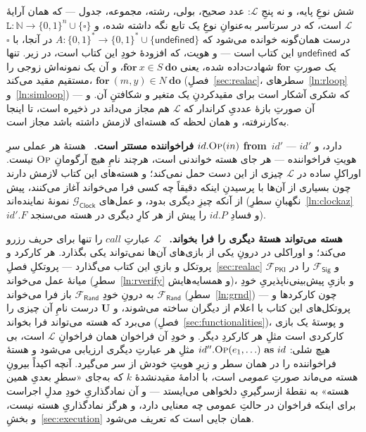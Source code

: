 \documentclass[10pt,oneside,openany]{book}
\newcommand{\uses}{\mathbf{U}}
\newcommand{\op}[1]{\textnormal{\textsc{#1}}}
\newcommand{\id}{id}
\newcommand{\Frand}{\mathcal{F}_{\mathsf{Rand}}}
\newcommand{\Fsig}{\mathcal{F}_{\mathsf{Sig}}}
\newcommand{\Gclock}{\mathcal{G}_{\mathsf{Clock}}}
\newcommand{\Fpki}{\mathcal{F}_{\mathsf{PKI}}}
\newcommand{\unset}{\square}
\newcommand{\V}[1]{\mathtt{#1}}
\newcommand{\Op}{\op{Op}}
\newcommand{\heading}[1]{\medskip\par\noindent\textcolor{accent}{\textbf{#1.}}\ }
\theoremstyle{accentdef}
\theoremstyle{accentplain}
\begin{document}
شش نوعِ پایه، و نه پنجِ $\mathcal{L}$: عدد صحیح، بولی، رشته، مجموعه، جدول
--- که همان آرایهٔ $\mathcal{L}$ است، که در سرتاسر به‌عنوانِ نوعِ یک تابع نگه
داشته شده، و $\V{L} : \mathbb{N} \to \{0,1\}^{n} \cup \{\unset\}$ درست
همان‌گونه خوانده می‌شود که $A : \{0,1\}^{*} \to \{0,1\}^{*} \cup
\{\textsf{undefined}\}$ در آنجا، با $\unset$ که $\textsf{undefined}$ِ این
کتاب است --- و هویت، که افزودهٔ خودِ این کتاب است، در زیر. تنها یک صورتِ
$\textbf{for}$ شهادت‌داده شده، یعنی $\textbf{for}\ x \in S\ \textbf{do}$، و
آن یک نمونه‌اش زوجی را مستقیم مقید می‌کند، $\textbf{for}\ (m,y) \in N\
\textbf{do}$ (فصلِ~\ref{sec:realac}، سطرهای~\ref{ln:rloop}
و~\ref{ln:simloop}) --- که شکری آشکار است برای مقیدکردنِ یک متغیر و شکافتنِ
آن. و آن صورتِ بازهٔ عددیِ کراندار که $\mathcal{L}$ هم مجاز می‌داند در ذخیره
است، تا اینجا به‌کارنرفته، و همان لحظه که هسته‌ای لازمش داشته باشد مجاز
است.

\heading{فراخواننده مستتر است} هستهٔ هر عملی سرِ $\id.\Op(in)$
\textbf{from}~$\id'$ دارد، و $\id'$ --- هویتِ فراخواننده --- هر جای هسته
خواندنی است، هرچند نامِ هیچ آرگومانِ $\Op$ نیست. اوراکلِ ساده در
$\mathcal{L}$ چیزی از این دست حمل نمی‌کند؛ و هسته‌های این کتاب لازمش دارند
چون بسیاری از آن‌ها با پرسیدنِ اینکه دقیقاً چه کسی فرا می‌خواند آغاز
می‌کنند، پیش از آنکه چیزِ دیگری بدود، و عمل‌های $\Gclock$ نمونهٔ نماینده‌اند
(نگهبانِ سطرِ~\ref{ln:clockaz} $\id'.F$ و فسادِ $\id.P$ را پیش از هر کارِ
دیگری در هسته می‌سنجد).

\heading{هسته می‌تواند هستهٔ دیگری را فرا بخواند} $\mathcal{L}$ عبارتِ
$\mathit{call}$ را تنها برای حریف رزرو می‌کند؛ و اوراکلی در درونِ یکی از
بازی‌های آن‌ها نمی‌تواند یکی بگذارد. هر کارکرد و پروتکل و بازیِ این کتاب
می‌گذارد --- پروتکلِ فصلِ~\ref{sec:realac} $\Fpki$ و $\Fsig$ را در میانهٔ
عمل می‌خواند (سطرِ~\ref{ln:rverify} و همسایه‌هایش)، و بازیِ
پیش‌بینی‌ناپذیریِ خودِ $\Frand$ به درونِ خودِ $\Frand$ باز فرا می‌خواند
(سطرِ~\ref{ln:grnd}) --- چون کارکردها و پروتکل‌های این کتاب با اعلام از
دیگران ساخته می‌شوند، و $\uses$ درست نامِ آن چیزی را می‌برد که هسته
می‌تواند فرا بخواند (فصلِ~\ref{sec:functionalities})، و پوستهٔ یک بازی
کارکردی است مثلِ هر کارکردِ دیگر. و خودِ آن فراخوان همان فراخوانِ
$\mathcal{L}$ است، بی هیچ شلی: $\id''.\Op(e_1,\ldots)\ \textbf{as}\ \id$
مثلِ هر عبارتِ دیگری ارزیابی می‌شود و هستهٔ فراخواننده را در همان سطر و
زیرِ هویتِ خودش از سر می‌گیرد. آنچه اکیداً بیرونِ هسته می‌ماند صورتِ
\emph{عمومی} است، با ادامهٔ مقیدنشدهٔ $k$ که به‌جای «سطرِ بعدیِ همین هسته» به
نقطهٔ از‌سرگیریِ دلخواهی می‌ایستد --- و آن نمادگذاریِ خودِ مدلِ اجراست برای
اینکه فراخوان در حالتِ عمومی چه معنایی دارد، و هرگز نمادگذاریِ هسته نیست، و
بخشِ~\ref{sec:execution} همان جایی است که تعریف می‌شود.
\end{document}
